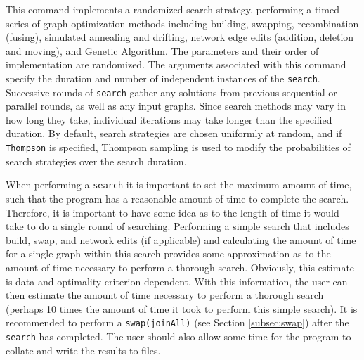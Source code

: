 	\begin{phygdescription}
		{This command implements a randomized search strategy, performing a timed 
		 series of graph optimization methods including building, swapping, 
		recombination (fusing), simulated annealing and drifting, network edge edits
		(addition, deletion and moving), and Genetic Algorithm. The parameters and 
		their order of implementation are randomized. The arguments 
		associated with this command specify the duration and number of independent 
		instances of the \texttt{search}. Successive rounds of \texttt{search} gather any 
		solutions from previous sequential or parallel rounds, as well as any input graphs. 
		Since search methods may vary in how long they take, individual iterations may 
		take longer than the specified duration.  By default, search strategies are chosen 
		uniformly at random, and if \texttt{Thompson} is specified, Thompson sampling 
		\cite{Thompson1933,WheelerThompson} is used to modify the probabilities 
		of search strategies over the search duration.
		
		When performing a \texttt{search} it is important to set the maximum amount of time, 
		such that the program has a reasonable amount of time to complete the search. 
		Therefore, it is important to have some idea as to the length of time it would take 
		to do a single round of searching. Performing a simple search that includes 
		build, swap, and network edits (if applicable) and calculating the amount of time 
		for a single graph within this search provides some approximation as to the amount 
		of time necessary to perform a thorough search. Obviously, this estimate is data and 
		optimality criterion dependent. With this information, the user can then estimate the 
		amount of time necessary to perform a thorough search (perhaps 10 times the 
		amount of time it took to perform this simple search). It is recommended to perform 
		a \texttt{swap(joinAll)} (see Section \ref{subsec:swap}) after the \texttt{search} has 
		completed. The user should also allow some time for the program to collate and 
		write the results to files.}
	\end{phygdescription}
			
